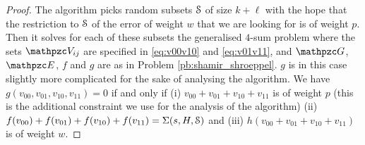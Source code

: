 \begin{proof}
The algorithm picks random subsets $\mathcal{S}$ of size $k+\ell$ with the hope that the restriction to $\mathcal{S}$ of the error
of weight $w$ that we are looking for is of weight $p$. 
Then it solves for each of these subsets the generalised
$4$-sum problem where the sets $\zV_{ij}$ are specified in \eqref{eq:v00v10} and \eqref{eq:v01v11}, 
and $\zG$, $\zE$, $f$ and $g$ are as  in Problem \ref{pb:shamir_shroeppel}.
$g$ is in this case slightly more complicated for the sake of analysing the algorithm.
We have 
$g(v_{00},v_{01},v_{10},v_{11})=0$ 
 if and only if (i) $v_{00}+v_{01}+v_{10}+v_{11}$ is of weight $p$ 
(this is the additional constraint we use for the analysis of the algorithm)
(ii) $f(v_{00})+f(v_{01})+f(v_{10})+f(v_{11})=\Sigma(s,H,\mathcal{S})$ and (iii) 
$h(v_{00}+v_{01}+v_{10}+v_{11})$ is of weight $w$.



\end{proof}
